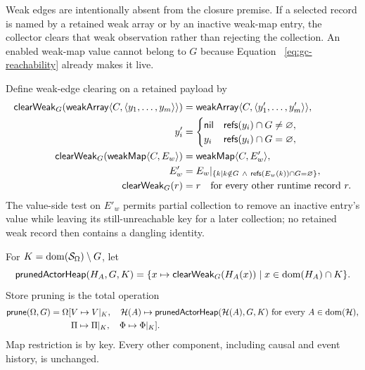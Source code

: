 Weak edges are intentionally absent from the closure premise.  If a selected
record is named by a retained weak array or by an inactive weak-map entry, the
collector clears that weak observation rather than rejecting the collection.
An enabled weak-map value cannot belong to $G$ because Equation~
\eqref{eq:gc-reachability} already makes it live.

Define weak-edge clearing on a retained payload by
\begin{equation}\label{eq:gc-clear-weak-payload}
\begin{aligned}
 \mathsf{clearWeak}_{G}
  (\mathsf{weakArray}\langle C,\langle y_1,\ldots,y_m\rangle\rangle)
  &=\mathsf{weakArray}\langle C,\langle y'_1,\ldots,y'_m\rangle\rangle,\\
 y'_i&=\begin{cases}
       \mathsf{nil}&\mathsf{refs}(y_i)\cap G\ne\varnothing,\\
       y_i&\mathsf{refs}(y_i)\cap G=\varnothing,
      \end{cases}\\
 \mathsf{clearWeak}_{G}(\mathsf{weakMap}\langle C,E_w\rangle)
  &=\mathsf{weakMap}\langle C,E'_w\rangle,\\
 E'_w&=E_w|_{\{k\mid k\notin G\ \land\
                    \mathsf{refs}(E_w(k))\cap G=\varnothing\}},\\
 \mathsf{clearWeak}_{G}(r)&=r
   \quad\text{for every other runtime record }r.
\end{aligned}
\end{equation}
The value-side test on $E'_w$ permits partial collection to remove an inactive
entry's value while leaving its still-unreachable key for a later collection;
no retained weak record then contains a dangling identity.

For $K=\mathop{\mathrm{dom}}(\mathcal S_\Omega)\setminus G$, let
\begin{equation}\label{eq:gc-pruned-actor-heap}
 \mathsf{prunedActorHeap}(H_A,G,K)=
 \{x\mapsto\mathsf{clearWeak}_{G}(H_A(x))
      \mid x\in\mathop{\mathrm{dom}}(H_A)\cap K\}.
\end{equation}
Store pruning is the total operation
\begin{equation}\label{eq:gc-prune-store}
\begin{split}
 \mathsf{prune}(\Omega,G)=\Omega[&
   V\mapsto V|_K,\quad
   \mathcal H(A)\mapsto
      \mathsf{prunedActorHeap}(\mathcal H(A),G,K)
      \text{ for every }A\in\mathop{\mathrm{dom}}(\mathcal H),\\
  &\Pi\mapsto\Pi|_K,\quad\Phi\mapsto\Phi|_K].
\end{split}
\end{equation}
Map restriction is by key.  Every other component, including causal and event
history, is unchanged.

